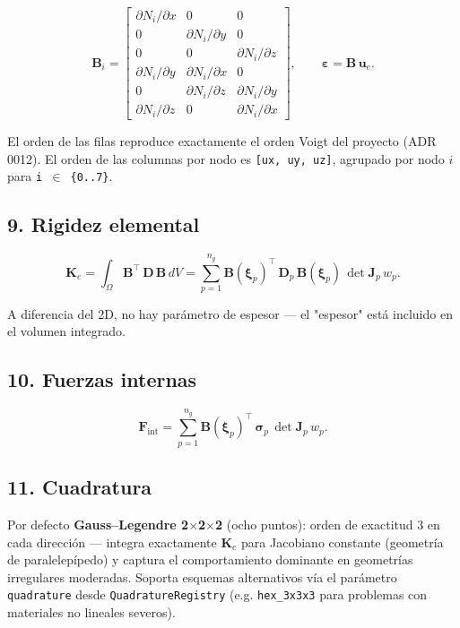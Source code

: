\documentclass[11pt,letterpaper,oneside]{report}
\begin{document}
\[
\mathbf B_i = \begin{bmatrix}
\partial N_i / \partial x & 0 & 0 \\
0 & \partial N_i / \partial y & 0 \\
0 & 0 & \partial N_i / \partial z \\
\partial N_i / \partial y & \partial N_i / \partial x & 0 \\
0 & \partial N_i / \partial z & \partial N_i / \partial y \\
\partial N_i / \partial z & 0 & \partial N_i / \partial x
\end{bmatrix}, \qquad \boldsymbol\varepsilon = \mathbf B\,\mathbf u_e.
\]

El orden de las filas reproduce exactamente el orden Voigt del proyecto (ADR 0012). El orden de las columnas por nodo es \texttt{[ux, uy, uz]}, agrupado por nodo $i$ para \texttt{i \ensuremath{\in} \{0..7\}}.

\subsection{9. Rigidez elemental}

\[
\mathbf K_e = \int_\Omega \mathbf B^\top\,\mathbf D\,\mathbf B\, dV = \sum_{p=1}^{n_g} \mathbf B(\boldsymbol\xi_p)^\top\,\mathbf D_p\,\mathbf B(\boldsymbol\xi_p)\,\det\mathbf J_p\, w_p.
\]

A diferencia del 2D, no hay parámetro de espesor --- el "espesor" está incluido en el volumen integrado.

\subsection{10. Fuerzas internas}

\[
\mathbf F_{\text{int}} = \sum_{p=1}^{n_g} \mathbf B(\boldsymbol\xi_p)^\top\,\boldsymbol\sigma_p\,\det\mathbf J_p\, w_p.
\]

\subsection{11. Cuadratura}

Por defecto \textbf{Gauss--Legendre 2\ensuremath{\times}2\ensuremath{\times}2} (ocho puntos): orden de exactitud 3 en cada dirección --- integra exactamente $\mathbf K_e$ para Jacobiano constante (geometría de paralelepípedo) y captura el comportamiento dominante en geometrías irregulares moderadas. Soporta esquemas alternativos vía el parámetro \texttt{quadrature} desde \texttt{QuadratureRegistry} (e.g. \texttt{hex\_3x3x3} para problemas con materiales no lineales severos).
\end{document}
